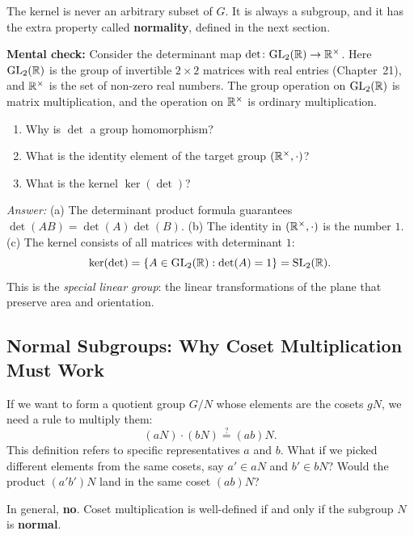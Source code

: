 The kernel is never an arbitrary subset of $G$. It is always a subgroup, and it has the extra property called \textbf{normality}, defined in the next section.

\begin{recoverybox}
\textbf{Mental check:} Consider the determinant map $\det \colon \mathrm{GL}_2(\mathbb{R}) \to \mathbb{R}^\times$. Here $\mathrm{GL}_2(\mathbb{R})$ is the group of invertible $2 \times 2$ matrices with real entries (Chapter~21), and $\mathbb{R}^\times$ is the set of non-zero real numbers. The group operation on $\mathrm{GL}_2(\mathbb{R})$ is matrix multiplication, and the operation on $\mathbb{R}^\times$ is ordinary multiplication.
\begin{enumerate}[label=(\alph*)]
  \item Why is $\det$ a group homomorphism?
  \item What is the identity element of the target group $(\mathbb{R}^\times, \cdot)$?
  \item What is the kernel $\ker(\det)$?
\end{enumerate}

\emph{Answer:} (a) The determinant product formula guarantees $\det(AB) = \det(A)\det(B)$. (b) The identity in $(\mathbb{R}^\times, \cdot)$ is the number $1$. (c) The kernel consists of all matrices with determinant $1$:
\[
\ker(\det) = \{A \in \mathrm{GL}_2(\mathbb{R}) : \det(A) = 1\} = \mathrm{SL}_2(\mathbb{R}).
\]
This is the \emph{special linear group}: the linear transformations of the plane that preserve area and orientation.
\end{recoverybox}

\subsection{Normal Subgroups: Why Coset Multiplication Must Work}

If we want to form a quotient group $G/N$ whose elements are the cosets $gN$, we need a rule to multiply them:
\[
(aN) \cdot (bN) \stackrel{?}{=} (ab)N.
\]
This definition refers to specific representatives $a$ and $b$. What if we picked different elements from the same cosets, say $a' \in aN$ and $b' \in bN$? Would the product $(a'b')N$ land in the same coset $(ab)N$?

In general, \textbf{no}. Coset multiplication is well-defined if and only if the subgroup $N$ is \textbf{normal}.

